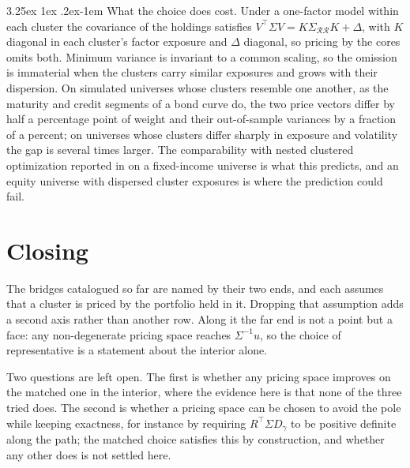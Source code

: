 \documentclass[11pt]{article}
\makeatletter
\renewcommand\paragraph{\@startsection{paragraph}{4}{\z@}%
  {3.25ex \@plus1ex \@minus.2ex}{-1em}%
  {\normalfont\normalsize\itshape}}
\makeatother
\begin{document}
\paragraph{What the choice does cost.} Under a one-factor model within each
cluster the covariance of the holdings satisfies $V^\top\Sigma V=K\Sigma_{\mathcal{R}
\mathcal{R}}K+\Delta$, with $K$ diagonal in each cluster's factor exposure and
$\Delta$ diagonal, so pricing by the cores omits both. Minimum variance is
invariant to a common scaling, so the omission is immaterial when the clusters
carry similar exposures and grows with their dispersion. On simulated universes
whose clusters resemble one another, as the maturity and credit segments of a
bond curve do, the two price vectors differ by half a percentage point of weight
and their out-of-sample variances by a fraction of a percent; on universes whose
clusters differ sharply in exposure and volatility the gap is several times
larger. The comparability with nested clustered optimization reported in
\cite{bajo2026} on a fixed-income universe is what this predicts, and an equity
universe with dispersed cluster exposures is where the prediction could fail.

\section{Closing}

The bridges catalogued so far are named by their two ends, and each assumes that
a cluster is priced by the portfolio held in it. Dropping that assumption adds a
second axis rather than another row. Along it the far end is not a point but a
face: any non-degenerate pricing space reaches $\Sigma^{-1}u$, so the choice of
representative is a statement about the interior alone.

Two questions are left open. The first is whether any pricing space improves on
the matched one in the interior, where the evidence here is that none of the
three tried does. The second is whether a pricing space can be chosen to avoid
the pole while keeping exactness, for instance by requiring
$R^\top\Sigma D_\gamma$ to be positive definite along the path; the matched
choice satisfies this by construction, and whether any other does is not settled
here.
\end{document}
